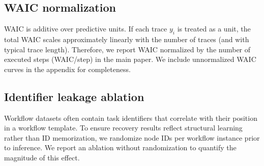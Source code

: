 \subsection{WAIC normalization}
\label{app:waic_normalization}
WAIC is additive over predictive units.
If each trace $y_i$ is treated as a unit, the total WAIC scales approximately linearly with the
number of traces (and with typical trace length).
Therefore, we report WAIC normalized by the number of executed steps (WAIC/step) in the main
paper. We include unnormalized WAIC curves in the appendix for completeness.

\subsection{Identifier leakage ablation}
\label{app:id_leakage}
Workflow datasets often contain task identifiers that correlate with their position in a
workflow template.
To ensure recovery results reflect structural learning rather than ID memorization, we randomize
node IDs per workflow instance prior to inference.
We report an ablation without randomization to quantify the magnitude of this effect.
